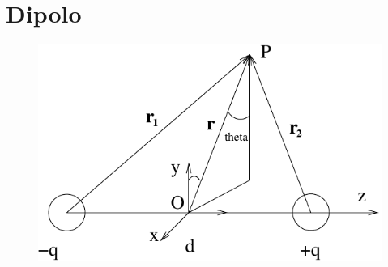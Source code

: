 \section{Dipolo}
\begin{figure}[htbp]
\centering
\includegraphics[scale=0.8]{immagini/fisica2/dipolo}
\end{figure}

